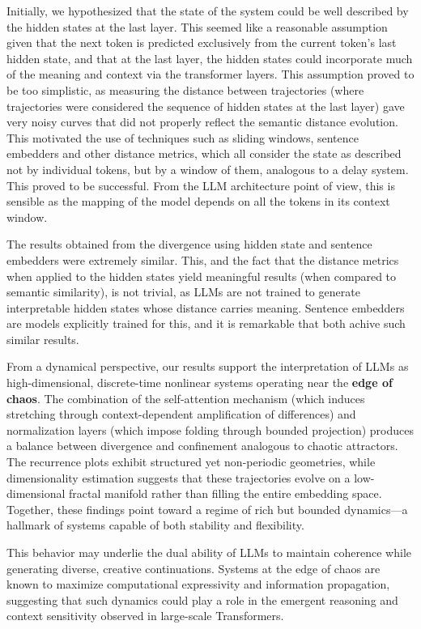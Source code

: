 \documentclass[a4paper,12pt]{article}
\begin{document}
Initially, we hypothesized that the state of the system could be well described by the hidden states at the last layer. This seemed like a reasonable assumption given that the next token is predicted exclusively from the current token's last hidden state, 
and that at the last layer, the hidden states could incorporate much of the meaning and context via the transformer layers.
This assumption proved to be too simplistic, as measuring the distance between trajectories (where trajectories were considered the sequence of hidden states at the last layer) gave very noisy curves that did not properly reflect the semantic distance evolution.
This motivated the use of techniques such as sliding windows, sentence embedders and other distance metrics, which all consider the state as described not by individual tokens, but by a window of them, analogous to a delay system. This proved to be successful. From the LLM architecture point of view, this is sensible as the mapping of the model depends on all the tokens in its context window.

The results obtained from the divergence using hidden state and sentence embedders were extremely similar. This, and the fact that the distance metrics when applied to the hidden states yield meaningful results (when compared to semantic similarity), is not trivial, as LLMs are not trained to generate interpretable hidden states whose distance carries meaning. Sentence embedders are models explicitly trained for this, and it is remarkable that both achive such similar results.

From a dynamical perspective, our results support the interpretation of LLMs as high-dimensional, discrete-time nonlinear systems operating near the \textbf{edge of chaos}. The combination of the self-attention mechanism (which induces stretching through context-dependent amplification of differences) and normalization layers (which impose folding through bounded projection) produces a balance between divergence and confinement analogous to chaotic attractors. The recurrence plots exhibit structured yet non-periodic geometries, while dimensionality estimation suggests that these trajectories evolve on a low-dimensional fractal manifold rather than filling the entire embedding space. Together, these findings point toward a regime of rich but bounded dynamics—a hallmark of systems capable of both stability and flexibility.

This behavior may underlie the dual ability of LLMs to maintain coherence while generating diverse, creative continuations. Systems at the edge of chaos are known to maximize computational expressivity and information propagation, suggesting that such dynamics could play a role in the emergent reasoning and context sensitivity observed in large-scale Transformers.
\end{document}
